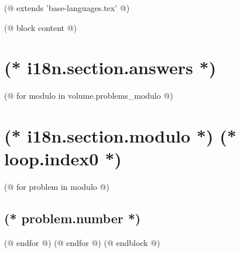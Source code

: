 (@ extends 'base-languages.tex' @)

(@ block content @)
    \thispagestyle{first}
    \afterpage{\globaldefs=1\restoregeometry}

    \vspace*{19mm}

    \section{(* i18n.section.answers *)}
    \pagestyle{answers}
    (@ for modulo in volume.problems_modulo @)
        \newpage%
        \section{(* i18n.section.modulo *) (* loop.index0 *)}
        (@ for problem in modulo @)%
            \setcounter{volume}{(* volume.number *)}%
            \setcounter{problem}{(* problem.number *)}%
            \subsection{(* problem.number *)}%
        (@ endfor @)
    (@ endfor @)
(@ endblock @)
